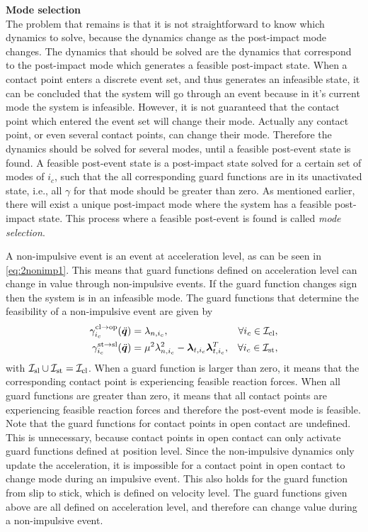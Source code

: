 \documentclass[../DC2017114Bouma.tex]{subfiles}
\begin{document}
\textbf{Mode selection}\\
The problem that remains is that it is not straightforward to know which dynamics to solve, because the dynamics change as the post-impact mode changes. The dynamics that should be solved are the dynamics that correspond to the post-impact mode which generates a feasible post-impact state. When a contact point enters a discrete event set, and thus generates an infeasible state, it can be concluded that the system will go through an event because in it's current mode the system is infeasible. However, it is not guaranteed that the contact point which entered the event set will change their mode. Actually any contact point, or even several contact points, can change their mode. Therefore the dynamics should be solved for several modes, until a feasible post-event state is found. A feasible post-event state is a post-impact state solved for a certain set of modes of $i_c$, such that the all corresponding guard functions are in its unactivated state, i.e., all $\gamma$ for that mode should be greater than zero. As mentioned earlier, there will exist a unique post-impact mode where the system has a feasible post-impact state. This process where a feasible post-event is found is called \textit{mode selection}.

A non-impulsive event is an event at acceleration level, as can be seen in \eqref{eq:2nonimp1}. This means that guard functions defined on acceleration level can change in value through non-impulsive events. If the guard function changes sign then the system is in an infeasible mode. The guard functions that determine the feasibility of a non-impulsive event are given by
\begin{align}
\gamma^{\text{cl}\rightarrow\text{op}}_{i_c}(\ddot{{\boldsymbol{q}}}) &= \lambda_{n,i_c}, & \forall i_c\in\mathcal{I}_{\text{cl}},\\
\gamma^{\text{st}\rightarrow\text{sl}}_{i_c}(\ddot{{\boldsymbol{q}}}) &= \mu^2\lambda_{n,i_c}^2 - \boldsymbol{\lambda}_{t,i_c}\boldsymbol{\lambda}_{t,i_c}^T, & \forall i_c\in\mathcal{I}_{\text{st}},
\end{align}
with $\mathcal{I}_{\text{sl}}\cup\mathcal{I}_{\text{st}}=\mathcal{I}_{\text{cl}}$. When a guard function is larger than zero, it means that the corresponding contact point is experiencing feasible reaction forces. When all guard functions are greater than zero, it means that all contact points are experiencing feasible reaction forces and therefore the post-event mode is feasible. Note that the guard functions for contact points in open contact are undefined. This is unnecessary, because contact points in open contact can only activate guard functions defined at position level. Since the non-impulsive dynamics only update the acceleration, it is impossible for a contact point in open contact to change mode during an impulsive event. This also holds for the guard function from slip to stick, which is defined on velocity level. The guard functions given above are all defined on acceleration level, and therefore can change value during a non-impulsive event.
\end{document}
